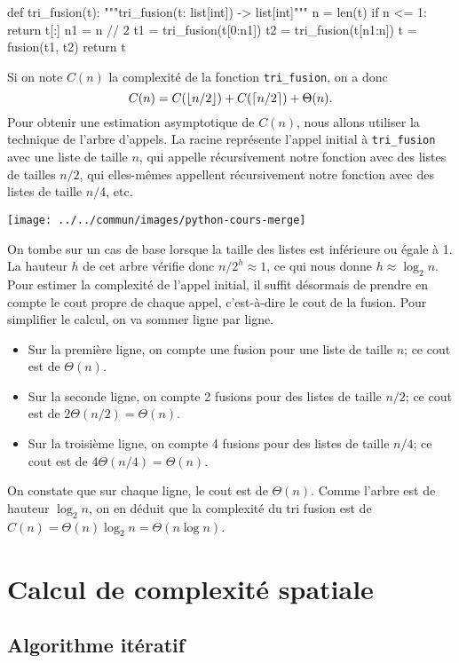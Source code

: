 \documentclass{magnolia}
\begin{document}
\begin{pythoncodeline}
def tri_fusion(t):
    """tri_fusion(t: list[int]) -> list[int]"""
    n = len(t)
    if n <= 1:
        return t[:]
    n1 = n // 2
    t1 = tri_fusion(t[0:n1])
    t2 = tri_fusion(t[n1:n])
    t = fusion(t1, t2)
    return t
\end{pythoncodeline}
Si on note $C(n)$ la complexité de la fonction \verb!tri_fusion!,
on a donc
\[C(n)=C(\left\lfloor n/2\right\rfloor) + C(\left\lceil n/2\right\rceil)+\Theta(n).\]
Pour obtenir une estimation asymptotique de $C(n)$, nous allons utiliser la technique
de l'arbre d'appels. La racine représente l'appel initial à \verb!tri_fusion! 
avec une liste de taille $n$, qui
appelle récursivement notre fonction avec des listes de tailles $n/2$, qui elles-mêmes appellent
récursivement notre fonction avec des listes de taille $n/4$, etc. 
\begin{center}
\texttt{[image: ../../commun/images/python-cours-merge]}
\end{center}
On tombe sur un cas de base lorsque la taille des listes est inférieure ou égale à 1.
La hauteur $h$ de cet arbre vérifie donc $n/2^h \approx 1$, ce qui nous donne
$h\approx \log_2 n$.
Pour estimer la complexité de l'appel initial, il suffit désormais de
prendre en compte le cout propre de chaque appel, c'est-à-dire le cout de la fusion. Pour
simplifier le calcul, on va sommer ligne par ligne.
\begin{itemize}
\item Sur la première ligne, on compte une fusion pour une liste de taille $n$; ce cout est de $\Theta(n)$.
\item Sur la seconde ligne,
on compte 2 fusions pour des listes de taille $n/2$; ce cout est de
$2\Theta(n/2)=\Theta(n)$.
\item Sur la troisième ligne, on compte 4 fusions pour des listes
de taille $n/4$; ce cout est de $4\Theta(n/4)=\Theta(n)$.
\end{itemize}
On constate que sur chaque
ligne, le cout est de $\Theta(n)$. Comme l'arbre est de hauteur $\log_2 n$, on en déduit
que la complexité du tri fusion est de $C(n)=\Theta(n)\log_2 n=\Theta(n\log n)$.

\section{Calcul de complexité spatiale}

\subsection{Algorithme itératif}
\end{document}
